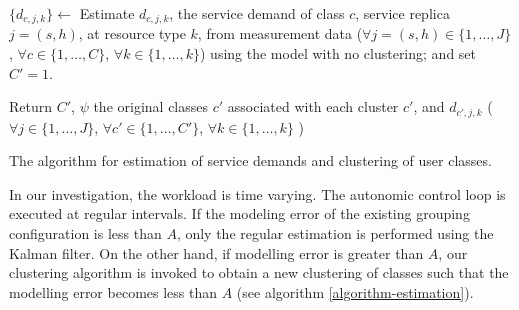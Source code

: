 \begin{algorithm}
	\small
	\SetAlgoVlined
       \SetAlFnt{\tiny}



\BlankLine
$\{d_{c,j,k}\} \gets$ Estimate $d_{c,j,k}$, the service demand of class $c$, service replica $j=(s,h)$, at resource type $k$, from measurement data ($\forall j=(s,h)\in\{1, \dots,J\}$, $\forall c\in\{1, \dots,C\}$, $\forall k\in\{1, \dots,k\}$) using the model with no clustering; and set $C' = 1$.
\BlankLine 

Return $C'$, $\psi$ the original classes $c'$ associated with each cluster $c'$, and
$d_{c',j,k}$ ($\forall j\in\{1,\dots,J\}$, $\forall c'\in\{1,...,C'\}$, $\forall k\in\{1, \dots,k\}$ ) 
\BlankLine

\caption[The algorithm for estimation of service demands and clustering of user classes.]{The algorithm for estimation of service demands and clustering of user classes.}
\label{algorithm-estimation}
\end{algorithm}

In our investigation, the workload is time varying. The autonomic control loop is executed at regular intervals. If the modeling error of the existing grouping configuration is less than $A$, only the regular estimation is performed using the Kalman filter. On the other hand, if modelling error is greater than $A$, our clustering algorithm is invoked to obtain a new clustering of classes such that the modelling error becomes less than $A$ (see algorithm \ref{algorithm-estimation}). 

